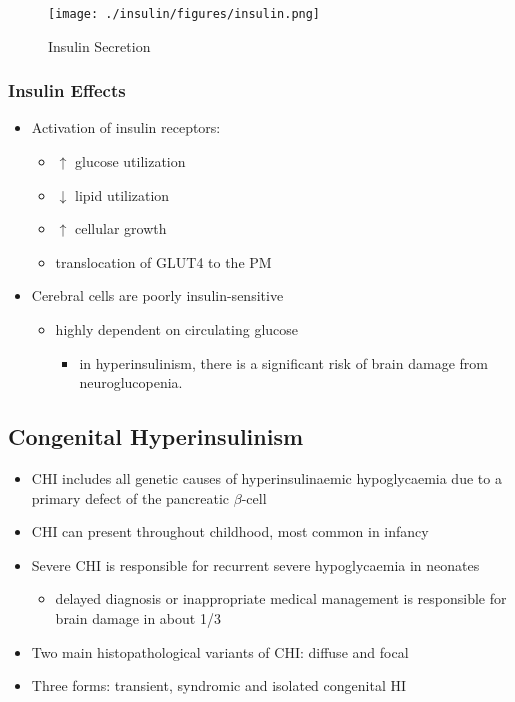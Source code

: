 \documentclass{scrartcl}
\begin{document}
\begin{figure}[htbp]
\centering
\texttt{[image: ./insulin/figures/insulin.png]}
\caption[insulin]{\label{fig:org87bcb0c}
Insulin Secretion}
\end{figure}

\subsubsection{Insulin Effects}
\label{sec:orgd8673c9}
\begin{itemize}
\item Activation of insulin receptors:
\begin{itemize}
\item \(\uparrow\) glucose utilization
\item \(\downarrow\) lipid utilization
\item \(\uparrow\) cellular growth
\item translocation of GLUT4 to the PM
\end{itemize}
\item Cerebral cells are poorly insulin-sensitive
\begin{itemize}
\item highly dependent on circulating glucose
\begin{itemize}
\item in hyperinsulinism, there is a significant risk of brain damage
from neuroglucopenia.
\end{itemize}
\end{itemize}
\end{itemize}

\subsection{Congenital Hyperinsulinism}
\label{sec:org48920dc}
\begin{itemize}
\item CHI includes all genetic causes of hyperinsulinaemic
hypoglycaemia due to a primary defect of the pancreatic
\(\beta\)-cell
\item CHI can present throughout childhood, most common in infancy
\item Severe CHI is responsible for recurrent severe hypoglycaemia in neonates
\begin{itemize}
\item delayed diagnosis or inappropriate medical management is responsible for brain damage in about 1/3
\end{itemize}
\item Two main histopathological variants of CHI: diffuse and focal
\item Three forms: transient, syndromic and isolated congenital HI
\end{itemize}
\end{document}

